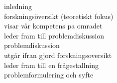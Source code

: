 inledning\\

forskningsöversikt (teoretiskt fokus)\\
  visar vår kompetens pa omradet\\
  leder fram till problemdiskussion\\

problemdiskussion\\
  utgår ifran gjord forskningsoversikt\\
  leder fram till en frågestallning\\

problemformulering och syfte\\
